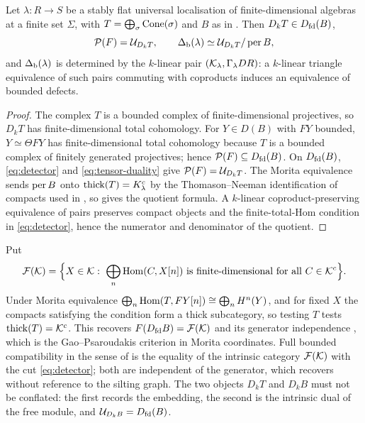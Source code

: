 \begin{corollary}\label{cor:pair-invariant}
Let \(\lambda:R\to S\) be a stably flat universal localisation of finite-dimensional algebras at a finite set \(\Sigma\), with \(T=\bigoplus_\sigma\operatorname{Cone}(\sigma)\) and \(B\) as in .  Then \(D_kT\in D_{\mathrm{fd}}(B)\),
\begin{equation}\label{eq:profile-as-cut}
 \mathcal P(F)=\mathcal U_{D_kT},
 \qquad
 \Delta_{\mathrm b}(\lambda)\simeq\mathcal U_{D_kT}/\operatorname{per} B,
\end{equation}
and \(\Delta_{\mathrm b}(\lambda)\) is determined by the \(k\)-linear pair \((\mathcal K_\lambda,\Gamma_\lambda DR)\): a \(k\)-linear triangle equivalence of such pairs commuting with coproducts induces an equivalence of bounded defects.
\end{corollary}

\begin{proof}
The complex \(T\) is a bounded complex of finite-dimensional projectives, so \(D_kT\) has finite-dimensional total cohomology.  For \(Y\in D(B)\) with \(FY\) bounded, \(Y\simeq\Theta FY\) has finite-dimensional total cohomology because \(T\) is a bounded complex of finitely generated projectives; hence \(\mathcal P(F)\subseteq D_{\mathrm{fd}}(B)\).  On \(D_{\mathrm{fd}}(B)\), \eqref{eq:detector} and \eqref{eq:tensor-duality} give \(\mathcal P(F)=\mathcal U_{D_kT}\).  The Morita equivalence sends \(\operatorname{per} B\) onto \(\operatorname{thick}(T)=K^c_\lambda\) by the Thomason--Neeman identification of compacts used in , so  gives the quotient formula.  A \(k\)-linear coproduct-preserving equivalence of pairs preserves compact objects and the finite-total-Hom condition in \eqref{eq:detector}, hence the numerator and denominator of the quotient.
\end{proof}

\begin{remark}\label{rem:intrinsic}
Put
\[
 \cF(\cK)=\Bigl\{X\in\cK:\ \bigoplus_n\Hom(C,X[n])\text{ is finite-dimensional for all }C\in\cK^c\Bigr\}.
\]
Under Morita equivalence \(\bigoplus_n\operatorname{Hom}(T,FY[n])\cong\bigoplus_nH^n(Y)\), and for fixed \(X\) the compacts satisfying the condition form a thick subcategory, so testing \(T\) tests \(\operatorname{thick}(T)=\mathcal K^c\).  This recovers \(F(D_{\mathrm{fd}} B)=\mathcal F(\mathcal K)\) and its generator independence , which is the Gao--Psaroudakis criterion \cite[Lemma~4.1]{GaoPsaroudakis18} in Morita coordinates.  Full bounded compatibility in the sense of  is the equality of the intrinsic category \(\mathcal F(\mathcal K)\) with the cut \eqref{eq:detector}; both are independent of the generator, which recovers  without reference to the silting graph.  The two objects \(D_kT\) and \(D_kB\) must not be conflated: the first records the embedding, the second is the intrinsic dual of the free module, and \(\mathcal U_{D_kB}=D_{\mathrm{fd}}(B)\).
\end{remark}

